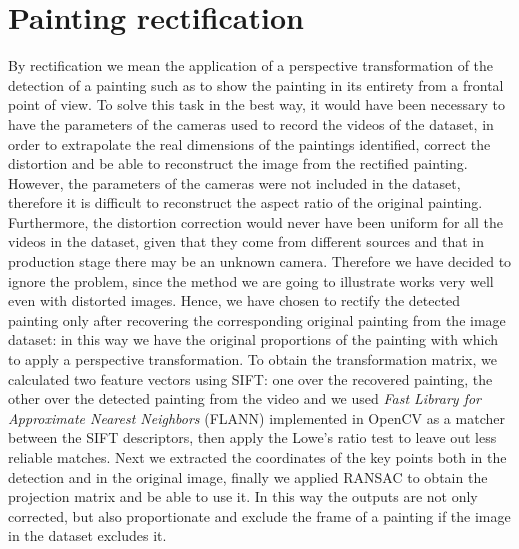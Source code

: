 \documentclass[10pt,twocolumn,letterpaper]{article}
\begin{document}
\section{Painting rectification}
\label{sec:PaintingRectification}
By rectification we mean the application of a perspective transformation of the detection of a painting such as to show the painting in its entirety from a frontal point of view. To solve this task in the best way, it would have been necessary to have the parameters of the cameras used to record the videos of the dataset, in order to extrapolate the real dimensions of the paintings identified, correct the distortion and be able to reconstruct the image from the rectified painting. However, the parameters of the cameras were not included in the dataset, therefore it is difficult to reconstruct the aspect ratio of the original painting. Furthermore, the distortion correction would never have been uniform for all the videos in the dataset, given that they come from different sources and that in production stage there may be an unknown camera. Therefore we have decided to ignore the problem, since the method we are going to illustrate works very well even with distorted images.
Hence, we have chosen to rectify the detected painting only after recovering the corresponding original painting from the image dataset: in this way we have the original proportions of the painting with which to apply a perspective transformation. To obtain the transformation matrix, we calculated two feature vectors using SIFT: one over the recovered painting, the other over the detected painting from the video and we used \textit{Fast Library for Approximate Nearest Neighbors} (FLANN) \cite{Muja09fastapproximate} implemented in OpenCV as a matcher between the SIFT descriptors, then apply the Lowe's ratio test to leave out less reliable matches. Next we extracted the coordinates of the key points both in the detection and in the original image, finally we applied RANSAC \cite{10.1145/358669.358692} to obtain the projection matrix and be able to use it. In this way the outputs are not only corrected, but also proportionate and exclude the frame of a painting if the image in the dataset excludes it.
\end{document}
